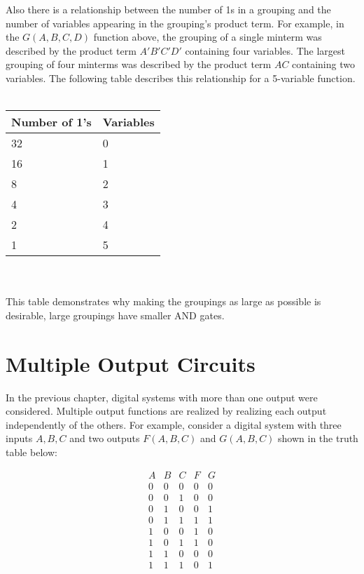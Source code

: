 Also there is a relationship between the number of 1s in a
grouping and the number of variables appearing in the grouping's
product term.  For example, in the $G(A,B,C,D)$ function
above, the grouping of a single minterm was described by the
product term $A'B'C'D'$ containing four variables.  The largest
grouping of four  minterms was described by the product term
$AC$ containing two variables.  The following table describes
this relationship for a 5-variable function.
\\ \\
\begin{tabular}{l|l}
Number of 1's    & Variables  \\ \hline
32        &    0    \\ \hline
16        &    1    \\ \hline
8        &    2    \\ \hline
4        &    3    \\ \hline
2        &    4    \\ \hline
1        &    5    \\
\end{tabular}
\\ \\
This table demonstrates why making the groupings as large
as possible is desirable, large groupings have smaller AND gates.

\section{Multiple Output Circuits}
In the previous chapter, digital systems with more than one output
were considered.  Multiple output functions are realized by
realizing each output independently of the others. For example,
consider a digital system with three inputs $A,B,C$ and two outputs
$F(A,B,C)$ and $G(A,B,C)$ shown in the truth table below:

$$
\begin{array}{c|c|c||c|c}
A & B & C & F & G \\ \hline
0 & 0 & 0 & 0 & 0 \\ \hline
0 & 0 & 1 & 0 & 0 \\ \hline
0 & 1 & 0 & 0 & 1 \\ \hline
0 & 1 & 1 & 1 & 1 \\ \hline
1 & 0 & 0 & 1 & 0 \\ \hline
1 & 0 & 1 & 1 & 0 \\ \hline
1 & 1 & 0 & 0 & 0 \\ \hline
1 & 1 & 1 & 0 & 1 \\
\end{array}$$

